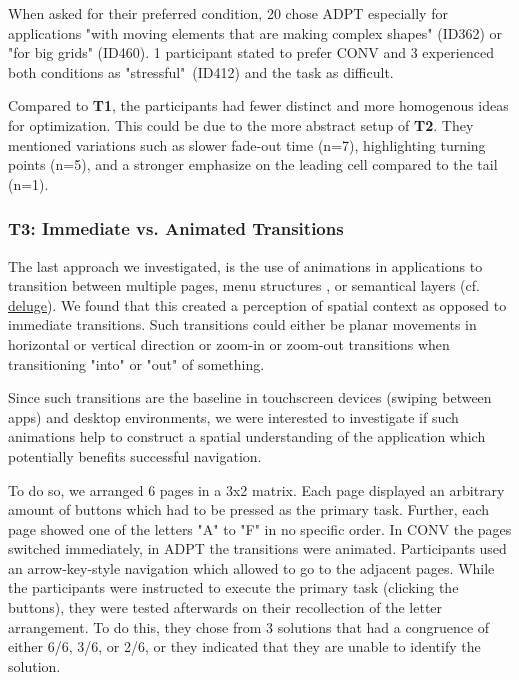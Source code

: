 \documentclass[sigconf]{nimeart}
\begin{document}
When asked for their preferred condition, 20 chose ADPT especially for applications "with moving elements that are making complex shapes" (ID362) or "for big grids" (ID460). 1 participant stated to prefer CONV and 3 experienced both conditions as "stressful"~(ID412) and the task as difficult.

Compared to \textbf{T1}, the participants had fewer distinct and more homogenous ideas for optimization. This could be due to the more abstract setup of \textbf{T2}. They mentioned variations such as slower fade-out time (n=7), highlighting turning points (n=5), and a stronger emphasize on the leading cell compared to the tail (n=1).

\subsubsection{\texorpdfstring{\textbf{T3}: Immediate vs. Animated Transitions}{T3: Immediate vs. Animated Transitions}}\label{t3-immediate-vs.-animated-transitions}

The last approach we investigated, is the use of animations in applications to transition between multiple pages, menu structures \cite{NIME21_17}, or semantical layers (cf. \href{https://synthstrom.com/product/deluge/}{deluge}). We found that this created a perception of spatial context as opposed to immediate transitions. Such transitions could either be planar movements in horizontal or vertical direction or zoom-in or zoom-out transitions when transitioning "into" or "out" of something.

Since such transitions are the baseline in touchscreen devices (swiping between apps) and desktop environments, we were interested to investigate if such animations help to construct a spatial understanding of the application which potentially benefits successful navigation.

To do so, we arranged 6 pages in a 3x2 matrix. Each page displayed an arbitrary amount of buttons which had to be pressed as the primary task. Further, each page showed one of the letters "A" to "F" in no specific order. In CONV the pages switched immediately, in ADPT the transitions were animated. Participants used an arrow-key-style navigation which allowed to go to the adjacent pages. While the participants were instructed to execute the primary task (clicking the buttons), they were tested afterwards on their recollection of the letter arrangement. To do this, they chose from 3 solutions that had a congruence of either 6/6, 3/6, or 2/6, or they indicated that they are unable to identify the solution.
\end{document}

